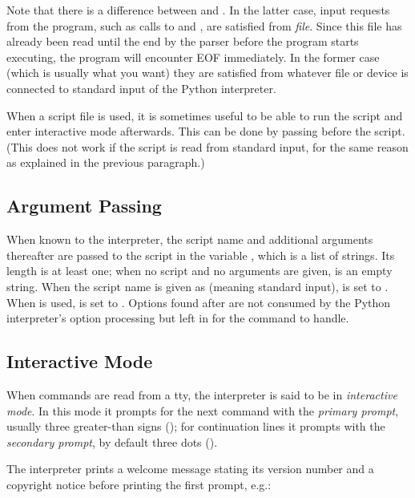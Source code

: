 \documentclass{manual}
\begin{document}
Note that there is a difference between  and
.  In the latter case, input requests from the
program, such as calls to  and , are
satisfied from \emph{file}.  Since this file has already been read
until the end by the parser before the program starts executing, the
program will encounter EOF immediately.  In the former case (which is
usually what you want) they are satisfied from whatever file or device
is connected to standard input of the Python interpreter.

When a script file is used, it is sometimes useful to be able to run
the script and enter interactive mode afterwards.  This can be done by
passing  before the script.  (This does not work if the script
is read from standard input, for the same reason as explained in the
previous paragraph.)

\subsection{Argument Passing}
\label{argPassing}

When known to the interpreter, the script name and additional
arguments thereafter are passed to the script in the variable
, which is a list of strings.  Its length is at least
one; when no script and no arguments are given,  is
an empty string.  When the script name is given as  (meaning 
standard input),  is set to .  When  is used,  is set to .  Options
found after  are not consumed by the Python
interpreter's option processing but left in  for the
command to handle.

\subsection{Interactive Mode}
\label{interactive}

When commands are read from a tty, the interpreter is said to be in
\emph{interactive mode}.  In this mode it prompts for the next command
with the \emph{primary prompt}, usually three greater-than signs
(\samp{>>> }); for continuation lines it prompts with the
\emph{secondary prompt},
by default three dots ().  

The interpreter prints a welcome message stating its version number
and a copyright notice before printing the first prompt, e.g.:
\end{document}
